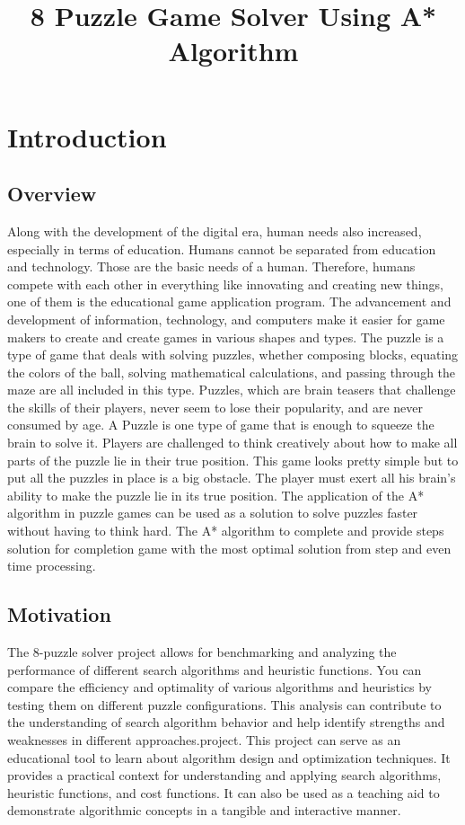 \documentclass[12pt]{report}
\title{8 Puzzle Game Solver Using A* Algorithm }
\begin{document}
    
    \tableofcontents
  

\newpage
\chapter{Introduction}

\section{Overview}
Along with the development of the digital era, human needs also increased, especially in terms of education. Humans cannot be separated from education and technology. Those are the basic needs of a human. Therefore, humans compete with each other in everything like innovating and creating new things, one of them is the educational game application program.
The advancement and development of information, technology, and computers make it easier for game makers to create and create games in various shapes and types. The puzzle is a type of game that deals with solving puzzles, whether composing blocks, equating the colors of the ball, solving mathematical calculations, and passing through the maze are all included in this type. Puzzles, which are brain teasers that challenge the skills of their players, never seem to lose their popularity, and are never consumed by age.\newline\newline 
A Puzzle is one type of game that is enough to squeeze the brain to solve it. Players are challenged to think creatively about how to make all parts of the puzzle lie in their true position. This game looks pretty simple but to put all the puzzles in place is a big obstacle. The player must exert all his brain's ability to make the puzzle lie in its true position. The application of the A* algorithm in puzzle games can be used as a solution to solve puzzles faster without having to think hard. The A* algorithm to complete and provide steps solution for completion game with the most optimal solution from step and even time processing.

\section{Motivation}
The 8-puzzle solver project allows for benchmarking and analyzing the performance of different search algorithms and heuristic functions. You can compare the efficiency and optimality of various algorithms and heuristics by testing them on different puzzle configurations. This analysis can contribute to the understanding of search algorithm behavior and help identify strengths and weaknesses in different approaches.project.\newline\newline
This project can serve as an educational tool to learn about algorithm design and optimization techniques. It provides a practical context for understanding and applying search algorithms, heuristic functions, and cost functions. It can also be used as a teaching aid to demonstrate algorithmic concepts in a tangible and interactive manner.
\end{document}
